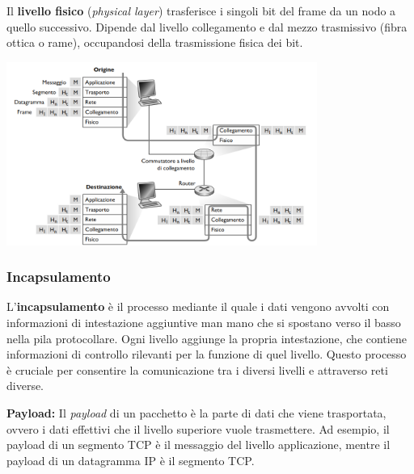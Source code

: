 Il \textbf{livello fisico} (\textit{physical layer}) trasferisce i singoli bit del frame da un nodo a quello successivo. Dipende dal livello collegamento e dal mezzo trasmissivo (fibra ottica o rame), occupandosi della trasmissione fisica dei bit.

\includegraphics[width=\textwidth, height=6cm, keepaspectratio]{img/stack_protocollare.png}

\subsubsection{Incapsulamento}

L'\textbf{incapsulamento} è il processo mediante il quale i dati vengono avvolti con informazioni di intestazione aggiuntive man mano che si spostano verso il basso nella pila protocollare. Ogni livello aggiunge la propria intestazione, che contiene informazioni di controllo rilevanti per la funzione di quel livello. Questo processo è cruciale per consentire la comunicazione tra i diversi livelli e attraverso reti diverse.

\textbf{Payload:} Il \textit{payload} di un pacchetto è la parte di dati che viene trasportata, ovvero i dati effettivi che il livello superiore vuole trasmettere. Ad esempio, il payload di un segmento TCP è il messaggio del livello applicazione, mentre il payload di un datagramma IP è il segmento TCP.

